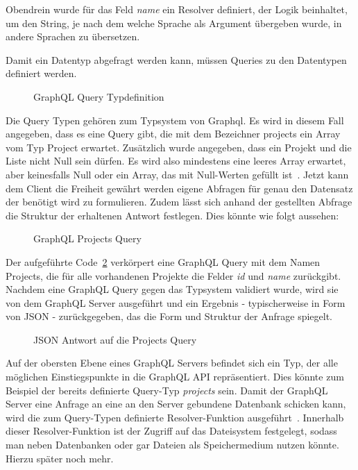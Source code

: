 Obendrein wurde für das Feld \emph{name} ein Resolver definiert, der Logik beinhaltet, um den String, je nach dem welche Sprache als Argument übergeben wurde,
in andere Sprachen zu übersetzen.

Damit ein Datentyp abgefragt werden kann, müssen Queries zu den Datentypen definiert werden.

\begin{figure}[h]
    
    \caption{GraphQL Query Typdefinition}
    \label{fig:basics:graphql:5}
\end{figure}

Die Query Typen gehören zum Typsystem von Graphql. Es wird in diesem Fall angegeben, dass es eine Query gibt, die mit dem Bezeichner projects
ein Array vom Typ Project erwartet. Zusätzlich wurde angegeben, dass ein Projekt und die Liste nicht Null sein dürfen.
Es wird also mindestens eine leeres Array erwartet, aber keinesfalls Null oder ein Array, das mit Null-Werten gefüllt ist~\cite{graphql}.
Jetzt kann dem Client die Freiheit gewährt werden eigene Abfragen für genau den Datensatz der benötigt wird zu formulieren.
Zudem lässt sich anhand der gestellten Abfrage die Struktur der erhaltenen Antwort festlegen. Dies könnte wie folgt aussehen:

\begin{figure}[h]
    
    \caption{GraphQL Projects Query}
    \label{fig:basics:graphql:6}
\end{figure}

Der aufgeführte Code~\ref{fig:basics:graphql:6} verkörpert eine GraphQL Query mit dem Namen Projects, die für alle vorhandenen Projekte die Felder \emph{id} und \emph{name}
zurückgibt. Nachdem eine GraphQL Query gegen das Typsystem validiert wurde, wird sie von dem GraphQL Server ausgeführt und
ein Ergebnis - typischerweise in Form von JSON - zurückgegeben, das die Form und Struktur der Anfrage spiegelt.

\begin{figure}[h]
    
    \caption{JSON Antwort auf die Projects Query}
    \label{fig:basics:graphql:7}
\end{figure}

Auf der obersten Ebene eines GraphQL Servers befindet sich ein Typ, der alle möglichen Einstiegspunkte in die GraphQL API repräsentiert.
Dies könnte zum Beispiel der bereits definierte Query-Typ \emph{projects} sein.
Damit der GraphQL Server eine Anfrage an eine an den Server gebundene Datenbank schicken kann, wird die zum Query-Typen definierte
Resolver-Funktion ausgeführt~\cite{graphql-execution}. Innerhalb dieser Resolver-Funktion ist der Zugriff auf das Dateisystem festgelegt, sodass
man neben Datenbanken oder gar Dateien als Speichermedium nutzen könnte. Hierzu später noch mehr.

